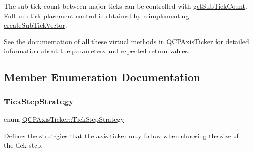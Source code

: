 The sub tick count between major ticks can be controlled with \hyperlink{class_q_c_p_axis_ticker_a4ccc403ced7a1457ce6ba293509933c8}{get\+Sub\+Tick\+Count}. Full sub tick placement control is obtained by reimplementing \hyperlink{class_q_c_p_axis_ticker_a9a6435723fa0bd366d1ea4c2cff7c33f}{create\+Sub\+Tick\+Vector}.

See the documentation of all these virtual methods in \hyperlink{class_q_c_p_axis_ticker}{Q\+C\+P\+Axis\+Ticker} for detailed information about the parameters and expected return values. 

\subsection{Member Enumeration Documentation}
\mbox{\label{class_q_c_p_axis_ticker_ab6d2f9d9477821623ac9bc4b21ddf49a}} 
\subsubsection{\texorpdfstring{Tick\+Step\+Strategy}{TickStepStrategy}}
{\footnotesize\ttfamily enum \hyperlink{class_q_c_p_axis_ticker_ab6d2f9d9477821623ac9bc4b21ddf49a}{Q\+C\+P\+Axis\+Ticker\+::\+Tick\+Step\+Strategy}}

Defines the strategies that the axis ticker may follow when choosing the size of the tick step.

